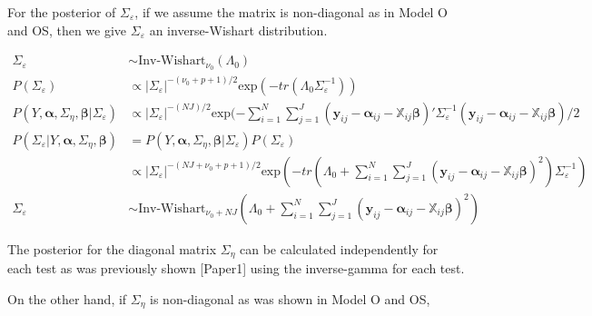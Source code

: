 \documentclass[
]{article}
\begin{document}
For the posterior of \(\Sigma_\varepsilon\), if we assume the matrix is non-diagonal as in Model O and OS, then we give \(\Sigma_\varepsilon\) an inverse-Wishart distribution.

\begin{equation*}
\begin{aligned}
\Sigma_\varepsilon &\sim \text{Inv-Wishart}_{\nu_0}(\Lambda_0)\\
P(\Sigma_\varepsilon) &\propto |\Sigma_\varepsilon|^{-(\nu_0+p+1)/2}\text{exp}(-tr(\Lambda_0\Sigma_\varepsilon^{-1}))\\
P(Y, \boldsymbol{\alpha}, \Sigma_\eta, \boldsymbol{\beta}|\Sigma_\varepsilon) &\propto |\Sigma_\varepsilon|^{-(NJ)/2}\text{exp}(-\sum^N_{i = 1}\sum^J_{j= 1} (\boldsymbol{y}_{ij} - \boldsymbol{\alpha}_{ij} - \boldsymbol{ \mathbb{X}}_{ij}\boldsymbol{\beta})'\Sigma_\varepsilon^{-1}(\boldsymbol{y}_{ij} - \boldsymbol{\alpha}_{ij} - \boldsymbol{ \mathbb{X}}_{ij}\boldsymbol{\beta})/2 \\
P(\Sigma_\varepsilon|Y, \boldsymbol{\alpha}, \Sigma_\eta, \boldsymbol{\beta}) & = P(Y, \boldsymbol{\alpha}, \Sigma_\eta, \boldsymbol{\beta}|\Sigma_\varepsilon)P(\Sigma_\varepsilon) \\ &\propto |\Sigma_\varepsilon|^{-(NJ +\nu_0+p+1)/2}\text{exp}(-tr(\Lambda_0 + \sum^N_{i = 1}\sum^J_{j= 1} (\boldsymbol{y}_{ij} - \boldsymbol{\alpha}_{ij} - \boldsymbol{ \mathbb{X}}_{ij}\boldsymbol{\beta})^2)\Sigma_\varepsilon^{-1})\\
\Sigma_\varepsilon & \sim \text{Inv-Wishart}_{\nu_0 + NJ}(\Lambda_0+\sum^N_{i = 1}\sum^J_{j= 1} (\boldsymbol{y}_{ij} - \boldsymbol{\alpha}_{ij} - \boldsymbol{ \mathbb{X}}_{ij}\boldsymbol{\beta})^2)
\end{aligned}
\end{equation*}

The posterior for the diagonal matrix \(\Sigma_\eta\) can be calculated independently for each test as was previously shown {[}Paper1{]} using the inverse-gamma for each test.

On the other hand, if \(\Sigma_\eta\) is non-diagonal as was shown in Model O and OS,
\end{document}
